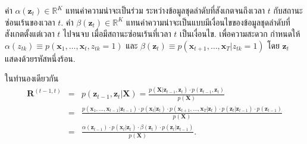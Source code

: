 ค่า $\alpha(\bm{z}_t) \in \mathbb{R}^K$
แทนค่าความน่าจะเป็นร่วม
ระหว่างข้อมูลชุดลำดับที่สังเกตจนถึงเวลา $t$
กับสถานะซ่อนเร้นของเวลา $t$.
ค่า $\beta(\bm{z}_t) \in \mathbb{R}^K$
แทนค่าความน่าจะเป็นแบบมีเงื่อนไขของข้อมูลชุดลำดับที่สังเกตตั้งแต่เวลา $t$ ไปจนจบ เมื่อมีสถานะซ่อนเร้นที่เวลา $t$ เป็นเงื่อนไข.
เพื่อความสะดวก กำหนดให้ $\alpha(z_{tk})
\equiv p(\bm{x}_1, \ldots, \bm{x}_t, z_{tk}=1)$
และ
$\beta(\bm{z}_t)
 \equiv p(\bm{x}_{t+1}, \ldots, \bm{x}_T| z_{tk}=1)$
โดย $\bm{z}_t$ แสดงด้วยรหัสหนึ่งร้อน.

ในทำนองเดียวกัน
\begin{eqnarray}
\bm{R}^{(t-1, t)}
&=&
p(\bm{z}_{t-1}, \bm{z}_t | \bm{X})
= \frac{p(\bm{X}|\bm{z}_{t-1}, \bm{z}_t) \cdot p(\bm{z}_{t-1}, \bm{z}_t)}{p(\bm{X})}
\nonumber \\
&=&
\frac{
p(\bm{x}_1, \ldots,\bm{x}_{t-1}|\bm{z}_{t-1})
\cdot p(\bm{x}_t|\bm{z}_t) \cdot
p(\bm{x}_{t+1}, \ldots, \bm{x}_T|\bm{z}_t)
\cdot p(\bm{z}_t| \bm{z}_{t-1}) 
\cdot p(\bm{z}_{t-1})
}{p(\bm{X})}
\nonumber \\
&=&
\frac{
	\alpha(\bm{z}_{t-1})
	\cdot p(\bm{x}_t|\bm{z}_t) \cdot
	\beta(\bm{z}_t)
	\cdot p(\bm{z}_t| \bm{z}_{t-1}) 
}{p(\bm{X})}
\label{eq: alpha-beta R alpha beta}.
\end{eqnarray}

